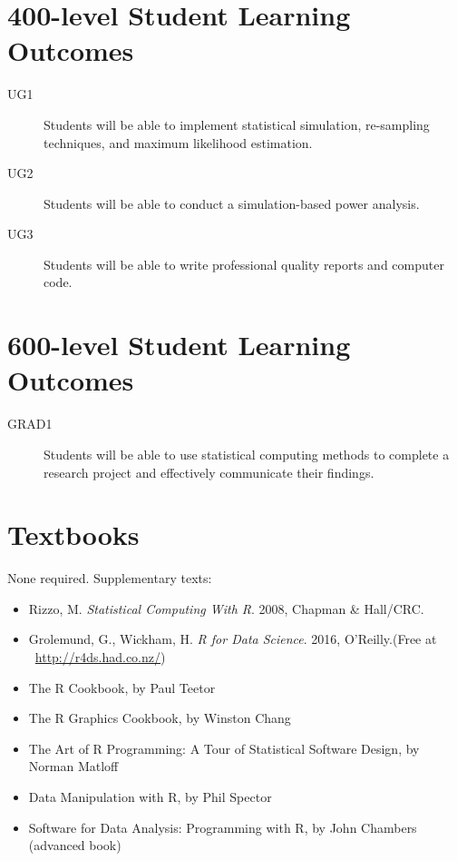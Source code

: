 \documentclass[11pt,onecolumn]{article}
\begin{document}
\section*{400-level Student Learning Outcomes}
\begin{description}
\item[UG1] Students will be able to implement statistical simulation, re-sampling techniques, and maximum likelihood estimation. 
\item[UG2] Students will be able to conduct a simulation-based power analysis. 
\item[UG3] Students will be able to write professional quality reports and computer code.
\end{description}

\section*{600-level Student Learning Outcomes}
\begin{description}
\item[GRAD1] Students will be able to use statistical computing methods to complete a research project and effectively communicate their findings.
\end{description}

\clearpage
\section*{Textbooks}
None required. Supplementary texts:
\begin{itemize} 
\item Rizzo, M. \emph{Statistical Computing With R}. 2008, Chapman \& Hall/CRC.
\item Grolemund, G., Wickham, H. \emph{R for Data Science}. 2016, O’Reilly.(Free at ~\url{http://r4ds.had.co.nz/})
\item The R Cookbook, by Paul Teetor
\item The R Graphics Cookbook, by Winston Chang
\item The Art of R Programming: A Tour of Statistical Software Design, by Norman Matloff
\item Data Manipulation with R, by Phil Spector
\item Software for Data Analysis: Programming with R, by John Chambers (advanced book)
\end{itemize}
\end{document}
